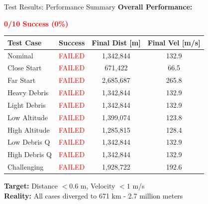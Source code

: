 \documentclass[aspectratio=169]{beamer}
\begin{document}
\begin{frame}{Test Results: Performance Summary}
\textbf{Overall Performance:}
\begin{center}
{\Huge \textcolor{red}{\textbf{0/10 Success (0\%)}}}
\end{center}

\vspace{0.3cm}
\begin{center}
\begin{tabular}{lccc}
\toprule
\textbf{Test Case} & \textbf{Success} & \textbf{Final Dist [m]} & \textbf{Final Vel [m/s]} \\
\midrule
Nominal & \textcolor{red}{FAILED} & 1,342,844 & 132.9 \\
Close Start & \textcolor{red}{FAILED} & 671,422 & 66.5 \\
Far Start & \textcolor{red}{FAILED} & 2,685,687 & 265.8 \\
Heavy Debris & \textcolor{red}{FAILED} & 1,342,844 & 132.9 \\
Light Debris & \textcolor{red}{FAILED} & 1,342,844 & 132.9 \\
Low Altitude & \textcolor{red}{FAILED} & 1,399,074 & 123.8 \\
High Altitude & \textcolor{red}{FAILED} & 1,285,815 & 128.4 \\
Low Debris Q & \textcolor{red}{FAILED} & 1,342,844 & 132.9 \\
High Debris Q & \textcolor{red}{FAILED} & 1,342,844 & 132.9 \\
Challenging & \textcolor{red}{FAILED} & 1,928,722 & 192.6 \\
\bottomrule
\end{tabular}
\end{center}

\vspace{0.2cm}
\textbf{Target:} Distance $< 0.6$ m, Velocity $< 1$ m/s \\
\textbf{Reality:} All cases diverged to 671 km - 2.7 million meters
\end{frame}
\end{document}
